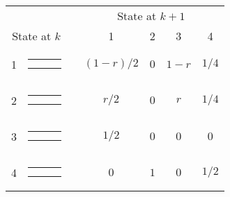 { \small \renewcommand{\arraystretch}{1.1}
\begin{center}
\begin{tabular}{ccccccc} \hline
 & & &\multicolumn{4}{c}{State at $k+1$} \\
\cline{4-7}
\multicolumn{2}{c}{State at $k$} & 
& 1& 2& 3& 4\\ \hline 
1 &
{\renewcommand{\arraystretch}{0.3}
\renewcommand{\tabcolsep}{0.5mm}
\parbox[b][3mm][c]{12mm}{
\begin{tabular}{|p{2mm}|p{2mm}||p{2mm}|} \hline
$\bullet$ &           &           \\
$\bullet$ &           &           \\ \hline
\end{tabular}}}
&
& $(1-r)/2$
& $0$
& $1-r$
& $1/4$
\\
2 &
{\renewcommand{\arraystretch}{0.3}
\renewcommand{\tabcolsep}{0.5mm}
\parbox[b][3mm][c]{12mm}{
\begin{tabular}{|p{2mm}|p{2mm}||p{2mm}|} \hline
$\bullet$ &           &           \\
          & $\bullet$ &           \\ \hline
\end{tabular}}}
&
& $r/2$
& $0$
& $r$
& $1/4$
\\
3 &
{\renewcommand{\arraystretch}{0.3}
\renewcommand{\tabcolsep}{0.5mm}
\parbox[b][3mm][c]{12mm}{
\begin{tabular}{|p{2mm}|p{2mm}||p{2mm}|} \hline
          &           & $\bullet$ \\
          &           & $\bullet$ \\ \hline
\end{tabular}}}
&
& $1/2$
& $0$
& $0$
& $0$
\\
4 &
{\renewcommand{\arraystretch}{0.3}
\renewcommand{\tabcolsep}{0.5mm}
\parbox[b][3mm][c]{12mm}{
\begin{tabular}{|p{2mm}|p{2mm}||p{2mm}|} \hline
$\bullet$ &           &           \\
          &           & $\bullet$ \\ \hline
\end{tabular}}}
&
& $0$
& $1$
& $0$
& $1/2$
\\
\hline
\end{tabular}
\end{center} }
